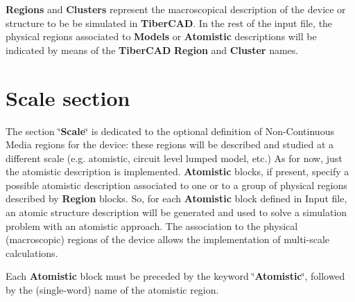 \vspace{2ex}

\textbf{Regions} and  \textbf{Clusters} represent the macroscopical description of the  device or  structure to be be simulated in \textbf{TiberCAD}.
In the  rest of  the  input  file,  the physical regions associated to \textbf{Models} or  \textbf{Atomistic}  descriptions will be indicated by means of  the  
\textbf{TiberCAD} \textbf{Region} and  \textbf{Cluster}  names.

% 
% 
% 
% 
% 
% 




\section{Scale  section }

The section \char`\"{}\textbf{Scale}\char`\"{}  is  dedicated to the  optional  definition of  Non-Continuous Media regions for the  device: these
 regions will  be  described and  studied at  a different  scale (e.g. atomistic, circuit level lumped model, etc.)
As for  now,  just the  atomistic  description is  implemented.
\textbf{Atomistic} blocks, if present,  specify a possible atomistic description associated to one or to a group 
of  physical regions described by \textbf{Region} blocks. So, for each \textbf{Atomistic} block defined in Input file,
an atomic structure description will be  generated and used to solve a simulation problem with an  atomistic approach.
The association to the  physical (macroscopic) regions of the  device allows the implementation of  multi-scale calculations. 

Each  \textbf{Atomistic} block must be preceded by the keyword \char`\"{}\textbf{Atomistic}\char`\"{}, followed by the  (single-word) name of
 the atomistic region.


